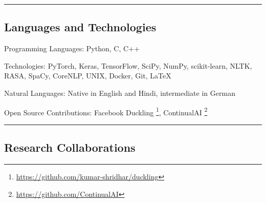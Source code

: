 \documentclass[10pt,letterpaper]{article}
\newenvironment{indentsection}[1]%
{\begin{list}{}%
	{\setlength{\leftmargin}{#1}}%
	\item[]%
}
{\end{list}}
\begin{document}
\hrule
\vspace{-0.4em}
\subsection*{\color{MidnightBlue}Languages and Technologies}

\begin{indentsection}{\parindent}
\begin{description*}
	\item[\color{BrickRed}Programming Languages:]
	Python, C, C++
	\item[\color{BrickRed}Technologies:]
	PyTorch, Keras, TensorFlow, SciPy, NumPy, scikit-learn, NLTK, RASA, SpaCy, CoreNLP, UNIX, Docker, Git, \LaTeX
	\item[\color{BrickRed}Natural Languages:]
	Native in English and Hindi, intermediate in German	
	\item[\color{BrickRed}Open Source Contributions:]
	Facebook Duckling \footnote{\url{ https://github.com/kumar-shridhar/duckling}}, ContinualAI \footnote{\url{https://github.com/ContinualAI}}
\end{description*}
\end{indentsection}

\hrule
\vspace{-0.4em}
\subsection*{\color{MidnightBlue} Research Collaborations}
\end{document}
